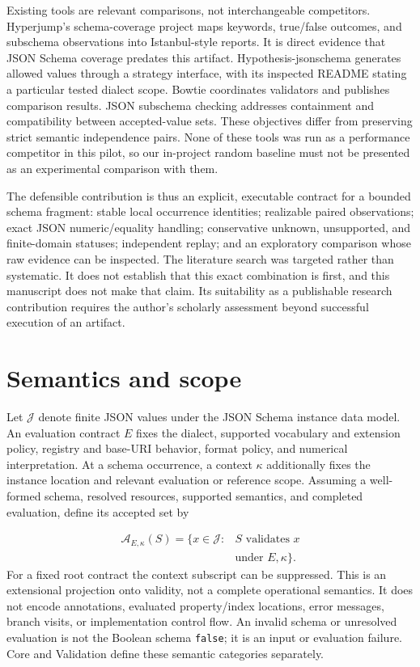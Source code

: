 \documentclass[sigconf,nonacm]{acmart}
\begin{document}
Existing tools are relevant comparisons, not interchangeable competitors. Hyperjump's schema-coverage project maps keywords, true/false outcomes, and subschema observations into Istanbul-style reports. It is direct evidence that JSON Schema coverage predates this artifact. Hypothesis-jsonschema generates allowed values through a strategy interface, with its inspected README stating a particular tested dialect scope. Bowtie coordinates validators and publishes comparison results. JSON subschema checking addresses containment and compatibility between accepted-value sets. These objectives differ from preserving strict semantic independence pairs. None of these tools was run as a performance competitor in this pilot, so our in-project random baseline must not be presented as an experimental comparison with them. \cite{ref11,ref12,ref13,ref20}

The defensible contribution is thus an explicit, executable contract for a bounded schema fragment: stable local occurrence identities; realizable paired observations; exact JSON numeric/equality handling; conservative unknown, unsupported, and finite-domain statuses; independent replay; and an exploratory comparison whose raw evidence can be inspected. The literature search was targeted rather than systematic. It does not establish that this exact combination is first, and this manuscript does not make that claim. Its suitability as a publishable research contribution requires the author's scholarly assessment beyond successful execution of an artifact.

\section{Semantics and scope}
Let $\mathcal{J}$ denote finite JSON values under the JSON Schema instance data model. An evaluation contract $E$ fixes the dialect, supported vocabulary and extension policy, registry and base-URI behavior, format policy, and numerical interpretation. At a schema occurrence, a context $\kappa$ additionally fixes the instance location and relevant evaluation or reference scope. Assuming a well-formed schema, resolved resources, supported semantics, and completed evaluation, define its accepted set by

\[
\begin{aligned}\mathcal{A}_{E,\kappa}(S)=\{x\in\mathcal{J}:{}&S\text{ validates }x\\&\text{under }E,\kappa\}.\end{aligned}
\]
For a fixed root contract the context subscript can be suppressed. This is an extensional projection onto validity, not a complete operational semantics. It does not encode annotations, evaluated property/index locations, error messages, branch visits, or implementation control flow. An invalid schema or unresolved evaluation is not the Boolean schema \texttt{f\allowbreak{}a\allowbreak{}l\allowbreak{}s\allowbreak{}e}; it is an input or evaluation failure. Core and Validation define these semantic categories separately. \cite{ref9,ref10}
\end{document}

